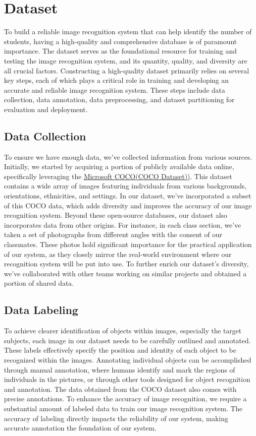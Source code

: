 \section{Dataset}
To build a reliable image recognition system that can help identify the number of students, having a high-quality and comprehensive database is of paramount importance. The dataset serves as the foundational resource for training and testing the image recognition system, and its quantity, quality, and diversity are all crucial factors. Constructing a high-quality dataset primarily relies on several key steps, each of which plays a critical role in training and developing an accurate and reliable image recognition system. These steps include data collection, data annotation, data preprocessing, and dataset partitioning for evaluation and deployment.\\
\label{sec:method}
\subsection{Data Collection}
\label{subsec:method}
To ensure we have enough data, we've collected information from various sources. Initially, we started by acquiring a portion of publicly available data online, specifically leveraging the \href{https://cocodataset.org/#home}{\underline{Microsoft COCO(COCO Dataset))}}. This dataset contains a wide array of images featuring individuals from various backgrounds, orientations, ethnicities, and settings. In our dataset, we've incorporated a subset of this COCO data, which adds diversity and improves the accuracy of our image recognition system. Beyond these open-source databases, our dataset also incorporates data from other origins. For instance, in each class section, we've taken a set of photographs from different angles with the consent of our classmates. These photos hold significant importance for the practical application of our system, as they closely mirror the real-world environment where our recognition system will be put into use. To further enrich our dataset's diversity, we've collaborated with other teams working on similar projects and obtained a portion of shared data.\\
\label{sec:method}
\subsection{Data Labeling}
\label{subsec:method}
To achieve clearer identification of objects within images, especially the target subjects, each image in our dataset needs to be carefully outlined and annotated. These labels effectively specify the position and identity of each object to be recognized within the images. Annotating individual objects can be accomplished through manual annotation, where humans identify and mark the regions of individuals in the pictures, or through other tools designed for object recognition and annotation. The data obtained from the COCO dataset also comes with precise annotations. To enhance the accuracy of image recognition, we require a substantial amount of labeled data to train our image recognition system. The accuracy of labeling directly impacts the reliability of our system, making accurate annotation the foundation of our system.\\
\label{sec:method}
